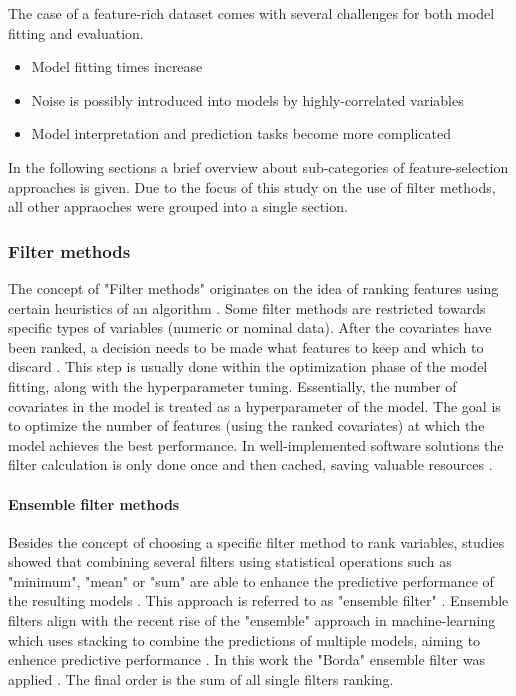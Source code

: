 \documentclass[letterpaper, journal]{IEEEtran}
\begin{document}
The case of a feature-rich dataset comes with several challenges for both model fitting and evaluation.

\begin{itemize}
  \item Model fitting times increase
  \item Noise is possibly introduced into models by highly-correlated variables \cite{johnstoneiainm.2009}
  \item Model interpretation and prediction tasks become more complicated \cite{johnstoneiainm.2009}
\end{itemize}

\noindent In the following sections a brief overview about sub-categories of feature-selection approaches is given.
Due to the focus of this study on the use of filter methods, all other appraoches were grouped into a single section.

\subsubsection{Filter methods}

\noindent The concept of "Filter methods" originates on the idea of ranking features using certain heuristics of an algorithm \cite{chandrashekar2014}.
Some filter methods are restricted towards specific types of variables (numeric or nominal data).
After the covariates have been ranked, a decision needs to be made what features to keep and which to discard \cite{drotar2015}.
This step is usually done within the optimization phase of the model fitting, along with the hyperparameter tuning.
Essentially, the number of covariates in the model is treated as a hyperparameter of the model.
The goal is to optimize the number of features (using the ranked covariates) at which the model achieves the best performance.
In well-implemented software solutions the filter calculation is only done once and then cached, saving valuable resources \cite{mlr}.

\paragraph{Ensemble filter methods}

Besides the concept of choosing a specific filter method to rank variables, studies showed that combining several filters using statistical operations such as "minimum", "mean" or "sum" are able to enhance the predictive performance of the resulting models \cite{abeel2010, drotar2017a}.
This approach is referred to as "ensemble filter" \cite{dietterich2000}.
Ensemble filters align with the recent rise of the "ensemble" approach in machine-learning which uses stacking to combine the predictions of multiple models, aiming to enhence predictive performance \cite{polikar2012, feurer2015}.
In this work the "Borda" ensemble filter was applied \cite{drotar2017a}.
The final order is the sum of all single filters ranking.
\end{document}
